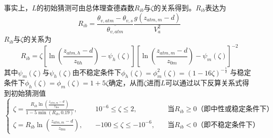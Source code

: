 事实上，$L$的初始猜测可由总体理查德森数$R_{ib}$与$\zeta$的关系得到\citep{arya2001introduction}。$R_{ib}$表达为
\begin{equation}\label{Rib}
R_{i b}=\frac{\theta_{v, atm}-\theta_{v, s}}{\overline{\theta_{v, atm}}} \frac{g\left(z_{atm, m}-d\right)}{V_{a}^{2}}
\end{equation}
$R_{ib}$与$\zeta$的关系为
\begin{equation}
R_{ib}=\zeta[\ln{\left(\frac{z_{atm,h}-d}{z_{0h}}\right)-\psi_h(\zeta)}] [\ln{\left(\frac{z_{atm,m}-d}{z_{0m}}\right)-\psi_m(\zeta)}]^{-2}
\end{equation}
其中$\psi_m(\zeta)$与$\psi_h(\zeta)$由不稳定条件下$\phi_h\left(\zeta\right)=\phi_m^2\left(\zeta\right)=\left(1-16\zeta\right)^{-\frac{1}{2}}$ 
与稳定条件下$\phi_h\left(\zeta\right)=\phi_m\left(\zeta\right)=1+5\zeta$确定，从而$\zeta$进而$L$可以通过以下反算关系式得到初始猜测值
\begin{equation}\label{ZetaRib}
\left\{\begin{array}{lll}\zeta=\frac{R_{i b} \ln \left(\frac{z_{atm, m}-d}{z_{0 m}}\right)}{1-5 \min \left(R_{i b}, 0.19\right)}, \quad & 10^{-6} \leq \zeta \leq 2, \quad & \text{当} R_{i b} \geq 0 \text{（即中性或稳定条件下）} \\
      \zeta=R_{i b} \ln \left(\frac{z_{atm, m}-d}{z_{0 m}}\right), \quad & -100 \leq \zeta \leq-10^{-6}, \quad & \text{当} R_{i b}<0 \text{（即不稳定条件下）}\end{array}\right.
\end{equation}

